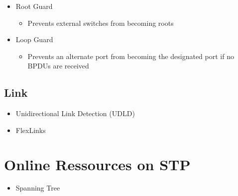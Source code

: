 \begin{itemize}
\begin{itemize}
    \end{itemize}
    \item Root Guard
    \begin{itemize}
        \item Prevents external switches from becoming roots
    \end{itemize}
    \item Loop Guard
    \begin{itemize}
        \item Prevents an alternate port from becoming the designated port if no BPDUs are received
    \end{itemize}
\end{itemize}

\subsection{Link}

\begin{itemize}
	\item Unidirectional Link Detection (UDLD)
	\item FlexLinks
\end{itemize}

\section*{Online Ressources on STP}

\begin{itemize}
    \item Spanning Tree \@WikiPedia \cite{wp_spanningtree}
\end{itemize}